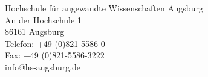 \documentclass{scrartcl}
\begin{document}
\begin{titlepage}
\begin{minipage}[t]{0.2\textwidth}
    \vspace{15mm}
    
    \textcolor{HSAred}{Hochschule für angewandte Wissenschaften Augsburg}\\
    \textcolor{HSAred}{An der Hochschule 1}\\
    \textcolor{HSAred}{86161 Augsburg}\\
    \textcolor{HSAred}{Telefon: +49 (0)821-5586-0}\\
    \textcolor{HSAred}{Fax: +49 (0)821-5586-3222}\\
    \textcolor{HSAred}{info@hs-augsburg.de}\\
    
  \end{minipage}
\end{titlepage}
\end{document}
